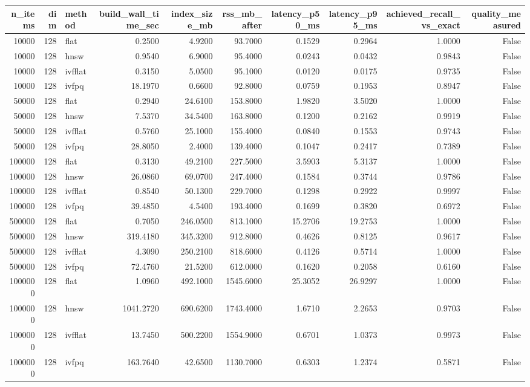 \begin{tabular}{rrlrrrrrrr}
\toprule
n_items & dim & method & build_wall_time_sec & index_size_mb & rss_mb_after & latency_p50_ms & latency_p95_ms & achieved_recall_vs_exact & quality_measured \\
\midrule
10000 & 128 & flat & 0.2500 & 4.9200 & 93.7000 & 0.1529 & 0.2964 & 1.0000 & False \\
10000 & 128 & hnsw & 0.9540 & 6.9000 & 95.4000 & 0.0243 & 0.0432 & 0.9843 & False \\
10000 & 128 & ivfflat & 0.3150 & 5.0500 & 95.1000 & 0.0120 & 0.0175 & 0.9735 & False \\
10000 & 128 & ivfpq & 18.1970 & 0.6600 & 92.8000 & 0.0759 & 0.1953 & 0.8947 & False \\
50000 & 128 & flat & 0.2940 & 24.6100 & 153.8000 & 1.9820 & 3.5020 & 1.0000 & False \\
50000 & 128 & hnsw & 7.5370 & 34.5400 & 163.8000 & 0.1200 & 0.2162 & 0.9919 & False \\
50000 & 128 & ivfflat & 0.5760 & 25.1000 & 155.4000 & 0.0840 & 0.1553 & 0.9743 & False \\
50000 & 128 & ivfpq & 28.8050 & 2.4000 & 139.4000 & 0.1047 & 0.2417 & 0.7389 & False \\
100000 & 128 & flat & 0.3130 & 49.2100 & 227.5000 & 3.5903 & 5.3137 & 1.0000 & False \\
100000 & 128 & hnsw & 26.0860 & 69.0700 & 247.4000 & 0.1584 & 0.3744 & 0.9786 & False \\
100000 & 128 & ivfflat & 0.8540 & 50.1300 & 229.7000 & 0.1298 & 0.2922 & 0.9997 & False \\
100000 & 128 & ivfpq & 39.4850 & 4.5400 & 193.4000 & 0.1699 & 0.3820 & 0.6972 & False \\
500000 & 128 & flat & 0.7050 & 246.0500 & 813.1000 & 15.2706 & 19.2753 & 1.0000 & False \\
500000 & 128 & hnsw & 319.4180 & 345.3200 & 912.8000 & 0.4626 & 0.8125 & 0.9617 & False \\
500000 & 128 & ivfflat & 4.3090 & 250.2100 & 818.6000 & 0.4126 & 0.5714 & 1.0000 & False \\
500000 & 128 & ivfpq & 72.4760 & 21.5200 & 612.0000 & 0.1620 & 0.2058 & 0.6160 & False \\
1000000 & 128 & flat & 1.0960 & 492.1000 & 1545.6000 & 25.3052 & 26.9297 & 1.0000 & False \\
1000000 & 128 & hnsw & 1041.2720 & 690.6200 & 1743.4000 & 1.6710 & 2.2653 & 0.9703 & False \\
1000000 & 128 & ivfflat & 13.7450 & 500.2200 & 1554.9000 & 0.6701 & 1.0373 & 0.9973 & False \\
1000000 & 128 & ivfpq & 163.7640 & 42.6500 & 1130.7000 & 0.6303 & 1.2374 & 0.5871 & False \\
\bottomrule
\end{tabular}
